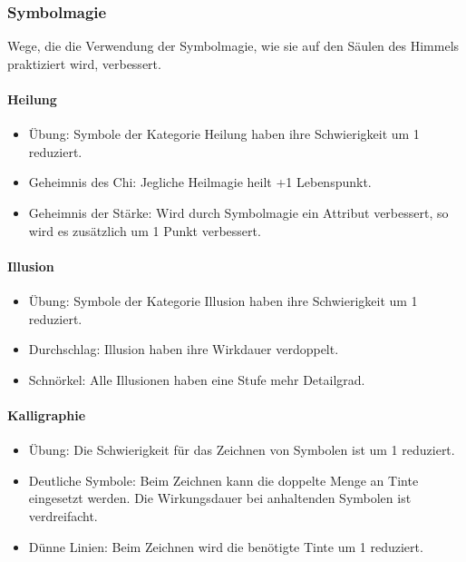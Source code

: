 \documentclass{article}
\begin{document}
\subsubsection{Symbolmagie}

Wege, die die Verwendung der Symbolmagie, wie sie auf den Säulen des Himmels praktiziert wird, verbessert.

\paragraph{Heilung}

\begin{itemize}
\item Übung: Symbole der Kategorie Heilung haben ihre Schwierigkeit um 1 reduziert.
\item Geheimnis des Chi: Jegliche Heilmagie heilt +1 Lebenspunkt.
\item Geheimnis der Stärke: Wird durch Symbolmagie ein Attribut verbessert, so wird es zusätzlich um 1 Punkt verbessert.
\end{itemize}

\paragraph{Illusion}

\begin{itemize}
\item Übung: Symbole der Kategorie Illusion haben ihre Schwierigkeit um 1 reduziert.
\item Durchschlag: Illusion haben ihre Wirkdauer verdoppelt.
\item Schnörkel: Alle Illusionen haben eine Stufe mehr Detailgrad.
\end{itemize}

\paragraph{Kalligraphie}

\begin{itemize}
\item Übung: Die Schwierigkeit für das Zeichnen von Symbolen ist um 1 reduziert.
\item Deutliche Symbole: Beim Zeichnen kann die doppelte Menge an Tinte eingesetzt werden. Die Wirkungsdauer bei anhaltenden Symbolen ist verdreifacht.
\item Dünne Linien: Beim Zeichnen wird die benötigte Tinte um 1 reduziert.
\end{itemize}
\end{document}
